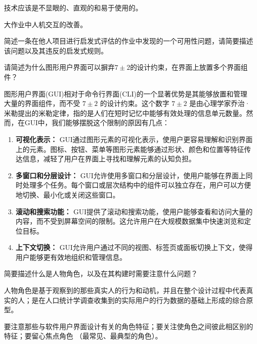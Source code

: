 \begin{solution}
技术应该是不显眼的、直观的和易于使用的。
\end{solution}



\begin{problem}[2014、2021]
大作业中人机交互的改善。

简述一条在他人项目进行启发式评估的作业中发现的一个可用性问题，请简要描述该问题以及其违反的启发式规则。
\end{problem}



\begin{problem}[2021]
请简述为什么图形用户界面可以摒弃$7 \pm 2$的设计约束，在界面上放置多个界面组件？
\end{problem}

\begin{solution}
图形用户界面(GUI)相对于命令行界面(CLI)的一个显著优势是其能够放置和管理大量的界面组件，而不受 $7 \pm 2$ 的设计约束。这个数字 $7 \pm 2$ 是由心理学家乔治·米勒提出的米勒定律，指的是人们在短时记忆中能够有效处理的信息单元数量。然而，在GUI中，我们能够摆脱这个限制的原因有几点：

\begin{enumerate}[label=\arabic*.]
    \item \textbf{可视化表示：} GUI通过图形元素的可视化表示，使用户更容易理解和识别界面上的元素。图标、按钮、菜单等图形元素能够通过形状、颜色和位置等特征传达信息，减轻了用户在界面上寻找和理解元素的认知负担。
    \item \textbf{多窗口和分层设计：} GUI允许使用多窗口和分层设计，使用户能够在界面上同时处理多个任务。每个窗口或层次结构中的组件可以独立存在，用户可以方便地切换、最小化或关闭这些窗口。
    \item \textbf{滚动和搜索功能：} GUI提供了滚动和搜索功能，使用户能够查看和访问大量的内容，而不受到屏幕空间的限制。这允许用户在大规模数据集中快速浏览和定位目标。
    \item \textbf{上下文切换：} GUI允许用户通过不同的视图、标签页或面板切换上下文，使得用户能够更有效地组织和管理信息。
\end{enumerate}
\end{solution}



\begin{problem}[2021]
简要描述什么是人物角色，以及在其构建时需要注意什么问题？
\end{problem}

\begin{solution}
人物角色是基于观察到的那些真实人的行为和动机，并且在整个设计过程中代表真实的人；是在人口统计学调查收集到的实际用户的行为数据的基础上形成的综合原型。

要注意那些与软件用户界面设计有关的角色特征；要关注使角色之间彼此相区别的特征；要留心焦点角色 （最常见、最典型的角色）。
\end{solution}



